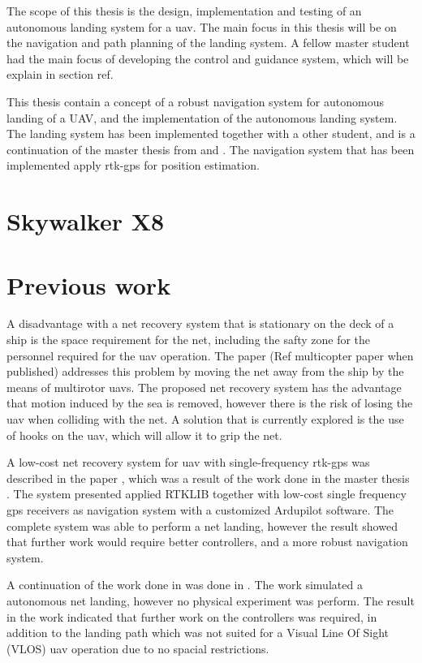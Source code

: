 The scope of this thesis is the design, implementation and testing of an autonomous landing system for a uav. The main focus in this thesis will be on the navigation and path planning of the landing system. A fellow master student had the main focus of developing the control and guidance system, which will be explain in section ref.


This thesis contain a concept of a robust navigation system for autonomous landing of a UAV, and the implementation of the autonomous landing system. The landing system has been implemented together with a other student, and is a continuation of the master thesis from \citep{Froelich} and \citep{Skulstad&Syversen}. The navigation system that has been implemented apply rtk-gps for position estimation.
\section{Skywalker X8}

\section{Previous work}
A disadvantage with a net recovery system that is stationary on the deck of a ship is the space requirement for the net, including the safty zone for the personnel required for the uav operation. The paper (Ref multicopter paper when published) addresses this problem by moving the net away from the ship by the means of multirotor uavs. The proposed net recovery system has the advantage that motion induced by the sea is removed, however there is the risk of losing the uav when colliding with the net. A solution that is currently explored is the use of hooks on the uav, which will allow it to grip the net.

A low-cost net recovery system for \gls{uav} with single-frequency \gls{rtk-gps} was described in the paper \citep{skulstad2015net}, which was a result of the work done in the master thesis \citep{Skulstad&Syversen}. The system presented applied RTKLIB together with low-cost single frequency \gls{gps} receivers as navigation system with a customized Ardupilot software. The complete system was able to perform a net landing, however the result showed that further work would require better controllers, and a more robust navigation system.

A continuation of the work done in \citep{Skulstad&Syversen} was done in \citep{Froelich}. The work simulated a autonomous net landing, however no physical experiment was perform. The result in the work indicated that further work on the controllers was required, in addition to the landing path which was not suited for a Visual Line Of Sight  (VLOS) \gls{uav} operation due to no spacial restrictions.
